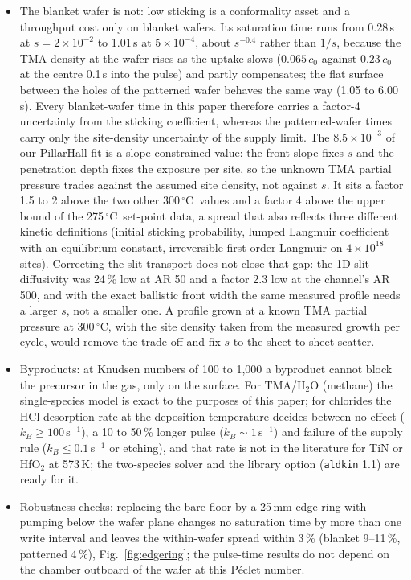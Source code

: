 \documentclass[11pt,letterpaper]{article}
\newcommand{\degC}{$^{\circ}$C}
\begin{document}
\begin{itemize}
\item The blanket wafer is not: low sticking is a conformality asset and a throughput cost only on blanket wafers. Its saturation time runs from 0.28\,s at $s = 2\times10^{-2}$ to 1.01\,s at $5\times10^{-4}$, about $s^{-0.4}$ rather than $1/s$, because the TMA density at the wafer rises as the uptake slows ($0.065\,c_0$ against $0.23\,c_0$ at the centre 0.1\,s into the pulse) and partly compensates; the flat surface between the holes of the patterned wafer behaves the same way (1.05 to 6.00\,s). Every blanket-wafer time in this paper therefore carries a factor-4 uncertainty from the sticking coefficient, whereas the patterned-wafer times carry only the site-density uncertainty of the supply limit. The $8.5\times10^{-3}$ of our PillarHall fit is a slope-constrained value: the front slope fixes $s$ and the penetration depth fixes the exposure per site, so the unknown TMA partial pressure trades against the assumed site density, not against $s$. It sits a factor 1.5 to 2 above the two other 300\,\degC\ values and a factor 4 above the upper bound of the 275\,\degC\ set-point data, a spread that also reflects three different kinetic definitions (initial sticking probability, lumped Langmuir coefficient with an equilibrium constant, irreversible first-order Langmuir on $4\times10^{18}$ sites). Correcting the slit transport does not close that gap: the 1D slit diffusivity was 24\,\% low at AR 50 and a factor 2.3 low at the channel's AR 500, and with the exact ballistic front width the same measured profile needs a larger $s$, not a smaller one. A profile grown at a known TMA partial pressure at 300\,\degC, with the site density taken from the measured growth per cycle, would remove the trade-off and fix $s$ to the sheet-to-sheet scatter.
\item Byproducts: at Knudsen numbers of 100 to 1,000 a byproduct cannot block the precursor in the gas, only on the surface. For TMA/H$_2$O (methane) the single-species model is exact to the purposes of this paper; for chlorides the HCl desorption rate at the deposition temperature decides between no effect ($k_B \geq 100$\,s$^{-1}$), a 10 to 50\,\% longer pulse ($k_B \sim 1$\,s$^{-1}$) and failure of the supply rule ($k_B \leq 0.1$\,s$^{-1}$ or etching), and that rate is not in the literature for TiN or HfO$_2$ at 573\,K; the two-species solver and the library option (\texttt{aldkin} 1.1) are ready for it.
\item Robustness checks: replacing the bare floor by a 25\,mm edge ring with pumping below the wafer plane changes no saturation time by more than one write interval and leaves the within-wafer spread within 3\,\% (blanket 9--11\,\%, patterned 4\,\%), Fig.~\ref{fig:edgering}; the pulse-time results do not depend on the chamber outboard of the wafer at this P\'eclet number.

\end{itemize}
\end{document}
